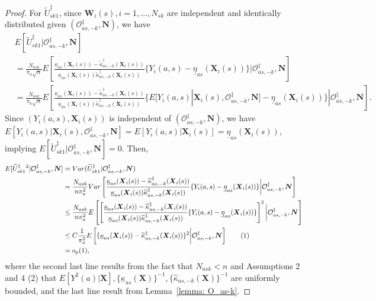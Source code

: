 \documentclass[12pt]{article}
\newcommand{\bX}{\boldsymbol{X}}
\newcommand{\bW}{\boldsymbol{W}}
\newcommand{\bN}{\boldsymbol{N}}
\newcommand\numberthis{\addtocounter{equation}{1}\tag{\theequation}}
\begin{document}
\begin{proof}
For $\widetilde{U}_{sk1}^\ddagger$, since $\bW_i(s), i=1,\dots, N_{sk}$ are independent and identically distributed given $(\mathcal{O}_{as,-k}^\ddagger,\bN)$, we have
\begin{align*}
   & E[\widetilde{U}_{sk1}^\ddagger|\mathcal{O}_{as,-k}^\ddagger,\bN]\\
   &= \frac{N_{ask}}{\pi_a\sqrt{n}} E\left[\frac{\underline{\kappa}_{as}(\bX_i(s)) - \widetilde{\kappa}_{as,-k}^\ddagger(\bX_i(s))}{\underline{\kappa}_{as}(\bX_i(s))\widetilde{\kappa}_{as,-k}^\ddagger(\bX_i(s))}\{Y_i(a,s) - \underline{\eta}_{as}(\bX_i(s))\}|\mathcal{O}_{as,-k}^\ddagger,\bN\right] \\
    &=\frac{N_{ask}}{\pi_a\sqrt{n}} E\left[\frac{\underline{\kappa}_{as}(\bX_i(s)) - \widetilde{\kappa}_{as,-k}^\ddagger(\bX_i(s))}{\underline{\kappa}_{as}(\bX_i(s))\widetilde{\kappa}_{as,-k}^\ddagger(\bX_i(s))}\{E[Y_i(a,s)|\bX_i(s),\mathcal{O}_{as,-k}^\ddagger,\bN]  - \underline{\eta}_{as}(\bX_i(s))\}|\mathcal{O}_{as,-k}^\ddagger,\bN\right].
\end{align*}
Since $(Y_i(a,s), \bX_i(s))$ is independent of $(\mathcal{O}_{as,-k}^\ddagger,\bN)$, we have $E[Y_i(a,s)|\bX_i(s),\mathcal{O}_{as,-k}^\ddagger,\bN]=E[Y_i(a,s)|\bX_i(s)] = \underline{\eta}_{as}(\bX_i(s))$, implying $E[\widetilde{U}_{sk1}^\ddagger|\mathcal{O}_{as,-k}^\ddagger,\bN] = 0$. Then, 
\begin{align*}
    E[\widetilde{U}_{sk1}^\ddagger{}^2|\mathcal{O}_{as,-k}^\ddagger,\bN] &= Var(\widetilde{U}_{sk1}^\ddagger|\mathcal{O}_{as,-k}^\ddagger,\bN) \\
    &= \frac{N_{ask}}{n\pi_a^2} Var\left[\frac{\underline{\kappa}_{as}(\bX_i(s)) - \widetilde{\kappa}_{as,-k}^\ddagger(\bX_i(s))}{\underline{\kappa}_{as}(\bX_i(s))\widetilde{\kappa}_{as,-k}^\ddagger(\bX_i(s))}\{Y_i(a,s) - \underline{\eta}_{as}(\bX_i(s))\}\bigg|\mathcal{O}_{as,-k}^\ddagger,\bN\right] \\
    &\le \frac{N_{ask}}{n\pi_a^2} E\left[\left[\frac{\underline{\kappa}_{as}(\bX_i(s)) - \widetilde{\kappa}_{as,-k}^\ddagger(\bX_i(s))}{\underline{\kappa}_{as}(\bX_i(s))\widetilde{\kappa}_{as,-k}^\ddagger(\bX_i(s))}\{Y_i(a,s) - \underline{\eta}_{as}(\bX_i(s))\}\right]^2\bigg|\mathcal{O}_{as,-k}^\ddagger,\bN\right] \\
    &\le  C\frac{1}{\pi_a^2} E\left[\{\underline{\kappa}_{as}(\bX_i(s)) - \widetilde{\kappa}_{as,-k}^\ddagger(\bX_i(s))\}^2\bigg|\mathcal{O}_{as,-k}^\ddagger,\bN\right] \numberthis\label{Eq: kappa-convergence-s}\\
    &= o_p(1),
\end{align*}
where the second last line results from the fact that $N_{ask}<n$ and Assumptions 2 and 4 (2) that $E[Y^2(a)|\bX], \{\underline{\kappa}_{as}(\bX)\}^{-1}, \{\widehat{\kappa}_{as,-k}(\bX)\}^{-1}$ are uniformly bounded, and the last line result from Lemma~\ref{lemma: O_as-k}.


\end{proof}
\end{document}
